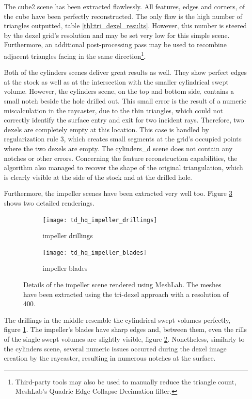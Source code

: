 %
The cube2 scene has been extracted flawlessly.
All features, \ie edges and corners, of the cube have been perfectly reconstructed.
The only flaw is the high number of triangles outputted, \cf table \ref{tbl:tri_dexel_results}.
However, this number is steered by the dexel grid's resolution and may be set very low for this simple scene.
Furthermore, an additional post-processing pass may be used to recombine adjacent triangles facing in the same direction\footnote{Third-party tools may also be used to manually reduce the triangle count, \eg MeshLab's Quadric Edge Collapse Decimation filter.}.

Both of the cylinders scenes deliver great results as well.
They show perfect edges at the stock as well as at the intersection with the smaller cylindrical swept volume.
However, the cylinders scene, on the top and bottom side, contains a small notch beside the hole drilled out.
This small error is the result of a numeric miscalculation in the raycaster, due to the thin triangles, which could not correctly identify the surface entry and exit for two incident rays.
Therefore, two dexels are completely empty at this location.
This case is handled by regularization rule 3, which creates small segments at the grid's occupied points where the two dexels are empty.
The cylinders\_d scene does not contain any notches or other errors.
Concerning the feature reconstruction capabilities, the algorithm also managed to recover the shape of the original triangulation, which is clearly visible at the side of the stock and at the drilled hole.

Furthermore, the impeller scenes have been extracted very well too.
Figure \ref{fig:td_hq_impeller_details} shows two detailed renderings.
%
\begin{figure}
	\centering
	\begin{subfigure}[b]{0.49\textwidth}
		\centering
		\texttt{[image: td\_hq\_impeller\_drillings]}
		\caption{impeller drillings}
		\label{fig:td_hq_impeller_drillings}
	\end{subfigure}
	\begin{subfigure}[b]{0.49\textwidth}
		\centering
		\texttt{[image: td\_hq\_impeller\_blades]}
		\caption{impeller blades}
		\label{fig:td_hq_impeller_blades}
	\end{subfigure}
	\caption{
		Details of the impeller scene rendered using MeshLab.
		The meshes have been extracted using the tri-dexel approach with a resolution of 400.
	}
	\label{fig:td_hq_impeller_details}
\end{figure}
%
The drillings in the middle resemble the cylindrical swept volumes perfectly, \cf figure \ref{fig:td_hq_impeller_drillings}.
The impeller's blades have sharp edges and, between them, even the rills of the single swept volumes are slightly visible, \cf figure \ref{fig:td_hq_impeller_blades}.
Nonetheless, similarly to the cylinders scene, several numeric issues occurred during the dexel image creation by the raycaster, resulting in numerous notches at the surface.

